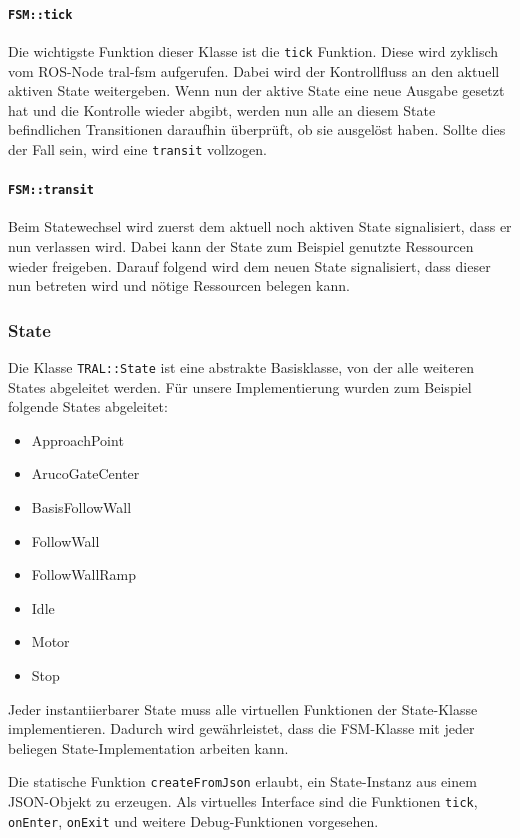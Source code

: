 \paragraph{\texttt{FSM::tick}}

Die wichtigste Funktion dieser Klasse ist die \texttt{tick} Funktion. Diese wird zyklisch vom ROS-Node tral-fsm aufgerufen. Dabei wird der Kontrollfluss an den aktuell aktiven State weitergeben. Wenn nun der aktive State eine neue Ausgabe gesetzt hat und die Kontrolle wieder abgibt, werden nun alle an diesem State befindlichen Transitionen daraufhin überprüft, ob sie ausgelöst haben. Sollte dies der Fall sein, wird eine \texttt{transit} vollzogen.

\paragraph{\texttt{FSM::transit}}

Beim Statewechsel wird zuerst dem aktuell noch aktiven State signalisiert, dass er nun verlassen wird. Dabei kann der State zum Beispiel genutzte Ressourcen wieder freigeben. Darauf folgend wird dem neuen State signalisiert, dass dieser nun betreten wird und nötige Ressourcen belegen kann.


\subsubsection{State}
Die Klasse \texttt{TRAL::State} ist eine abstrakte Basisklasse, von der alle weiteren States abgeleitet werden. Für unsere Implementierung wurden zum Beispiel folgende States abgeleitet:

\begin{itemize}
	\item ApproachPoint
	\item ArucoGateCenter
	\item BasisFollowWall
	\item FollowWall
	\item FollowWallRamp
	\item Idle
	\item Motor
	\item Stop
\end{itemize}

Jeder instantiierbarer State muss alle virtuellen Funktionen der State-Klasse implementieren. Dadurch wird gewährleistet, dass die FSM-Klasse mit jeder beliegen State-Implementation arbeiten kann.

Die statische Funktion \texttt{createFromJson} erlaubt, ein State-Instanz aus einem JSON-Objekt zu erzeugen. Als virtuelles Interface sind die Funktionen \texttt{tick}, \texttt{onEnter}, \texttt{onExit} und weitere Debug-Funktionen vorgesehen.

